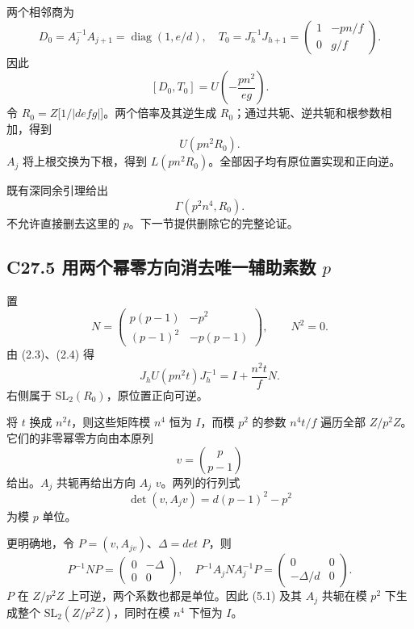 {两个相邻商为} \[
D_0=A_j^{-1}A_{j+1}=\operatorname{diag}(1,e/d),
\quad
T_0=J_h^{-1}J_{h+1}
=\begin{pmatrix}1&-pn/f\\0&g/f\end{pmatrix}.
\] {因此} \[
\boxed{[D_0,T_0]=U\!\left(-\frac{pn^2}{eg}\right).}
\tag{C27.4.1}
\] {令} {\ensuremath{R_{0}=Z}{[}\ensuremath{1/|defg|}{]}。两个倍率及其逆生成} {\ensuremath{R_{0}}；通过共轭、逆共轭和根参数相加，得到} \[
U(pn^2R_0).
\] {\ensuremath{A_{j}}} {将上根交换为下根，得到} {\ensuremath{L(pn^{2}R_{0})}。全部因子均有原位置实现和正向逆。}

{既有深同余引理给出} \[
\Gamma(p^2n^4,R_0).
\tag{C27.4.2}
\] {不允许直接删去这里的} {\ensuremath{p}。下一节提供删除它的完整论证。}

\subsection*{\texorpdfstring{{C27.5} {用两个幂零方向消去唯一辅助素数} {\ensuremath{p}}}{C27.5 用两个幂零方向消去唯一辅助素数 }}\label{C27-h172}

{置} \[
N=\begin{pmatrix}
p(p-1)&-p^2\\
(p-1)^2&-p(p-1)
\end{pmatrix},
\qquad N^2=0.
\] {由} {(2.3)、(2.4)} {得} \[
J_hU(pn^2t)J_h^{-1}=I+\frac{n^2t}{f}N.
\tag{C27.5.1}
\] {右侧属于} {\ensuremath{\mathrm{SL}_{2}(R_{0})}，原位置正向可逆。}

{将} {\ensuremath{t}} {换成} {\ensuremath{n^{2}t}，则这些矩阵模} {\ensuremath{n^{4}}} {恒为} {\ensuremath{I}，而模} {\ensuremath{p^{2}}} {的参数} {\ensuremath{n^{4}t/f}} {遍历全部} {\ensuremath{Z/p^{2}Z}。它们的非零幂零方向由本原列} \[
v=\binom p{p-1}
\] {给出。\ensuremath{A_{j}}} {共轭再给出方向} {\ensuremath{A_{j}}} {\ensuremath{v}。两列的行列式} \[
\det(v,A_jv)=d(p-1)^2-p^2
\tag{C27.5.2}
\] {为模} {\ensuremath{p}} {单位。}

{更明确地，令} {\ensuremath{P=(v,A_{jv})}、\ensuremath{\Delta =det}} {\ensuremath{P}，则} \[
P^{-1}NP=\begin{pmatrix}0&-\Delta\\0&0\end{pmatrix},
\quad
P^{-1}A_jNA_j^{-1}P=
\begin{pmatrix}0&0\\-\Delta/d&0\end{pmatrix}.
\tag{C27.5.3}
\] {\ensuremath{P}} {在} {\ensuremath{Z/p^{2}Z}} {上可逆，两个系数也都是单位。因此} {(5.1)} {及其} {\ensuremath{A_{j}}} {共轭在模} {\ensuremath{p^{2}}} {下生成整个} {\ensuremath{\mathrm{SL}_{2}(Z/p^{2}Z)}，同时在模} {\ensuremath{n^{4}}} {下恒为} {\ensuremath{I}。}

